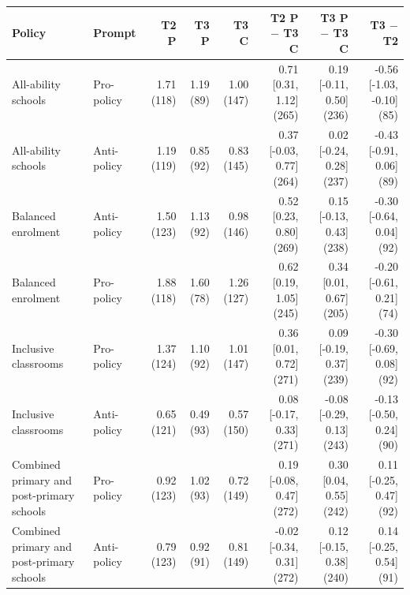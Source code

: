 
\begin{tabular}{llrrrrrr}
\toprule
Policy & Prompt & T2 P & T3 P & T3 C & T2 P $-$ T3 C & T3 P $-$ T3 C & T3 $-$ T2\\
\midrule
All-ability schools & Pro-policy & 1.71 (118) & 1.19 (89) & 1.00 (147) & 0.71 [0.31, 1.12] (265) & 0.19 [-0.11, 0.50] (236) & -0.56 [-1.03, -0.10] (85)\\
All-ability schools & Anti-policy & 1.19 (119) & 0.85 (92) & 0.83 (145) & 0.37 [-0.03, 0.77] (264) & 0.02 [-0.24, 0.28] (237) & -0.43 [-0.91, 0.06] (89)\\
Balanced enrolment & Anti-policy & 1.50 (123) & 1.13 (92) & 0.98 (146) & 0.52 [0.23, 0.80] (269) & 0.15 [-0.13, 0.43] (238) & -0.30 [-0.64, 0.04] (92)\\
Balanced enrolment & Pro-policy & 1.88 (118) & 1.60 (78) & 1.26 (127) & 0.62 [0.19, 1.05] (245) & 0.34 [0.01, 0.67] (205) & -0.20 [-0.61, 0.21] (74)\\
Inclusive classrooms & Pro-policy & 1.37 (124) & 1.10 (92) & 1.01 (147) & 0.36 [0.01, 0.72] (271) & 0.09 [-0.19, 0.37] (239) & -0.30 [-0.69, 0.08] (92)\\
Inclusive classrooms & Anti-policy & 0.65 (121) & 0.49 (93) & 0.57 (150) & 0.08 [-0.17, 0.33] (271) & -0.08 [-0.29, 0.13] (243) & -0.13 [-0.50, 0.24] (90)\\
Combined primary and post-primary schools & Pro-policy & 0.92 (123) & 1.02 (93) & 0.72 (149) & 0.19 [-0.08, 0.47] (272) & 0.30 [0.04, 0.55] (242) & 0.11 [-0.25, 0.47] (92)\\
Combined primary and post-primary schools & Anti-policy & 0.79 (123) & 0.92 (91) & 0.81 (149) & -0.02 [-0.34, 0.31] (272) & 0.12 [-0.15, 0.38] (240) & 0.14 [-0.25, 0.54] (91)\\
\bottomrule
\end{tabular}
